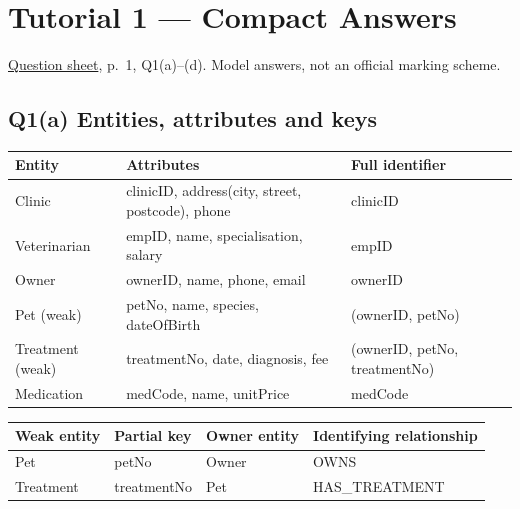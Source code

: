 \clearpage
\section{Tutorial 1 --- Compact Answers}\label{tutorial1_answers}

\href{../../../slides/Tutorial1.pdf}{Question sheet}, p.~1, Q1(a)--(d). Model answers, not an official marking scheme.

\subsection{Q1(a) Entities, attributes and keys}\label{tutorial1_answers-q1a-entities-attributes-and-keys}

\begin{longtable}[]{@{}
  >{\raggedright\arraybackslash}p{}
  >{\raggedright\arraybackslash}p{}
  >{\raggedright\arraybackslash}p{}@{}}
\toprule\noalign{}
\begin{minipage}[b]{\linewidth}\raggedright
Entity
\end{minipage} & \begin{minipage}[b]{\linewidth}\raggedright
Attributes
\end{minipage} & \begin{minipage}[b]{\linewidth}\raggedright
Full identifier
\end{minipage} \\
\midrule\noalign{}
\endhead
\bottomrule\noalign{}
\endlastfoot
Clinic & clinicID, address(city, street, postcode), phone & clinicID \\
Veterinarian & empID, name, specialisation, salary & empID \\
Owner & ownerID, name, phone, email & ownerID \\
Pet (weak) & petNo, name, species, dateOfBirth & (ownerID, petNo) \\
Treatment (weak) & treatmentNo, date, diagnosis, fee & (ownerID, petNo, treatmentNo) \\
Medication & medCode, name, unitPrice & medCode \\
\end{longtable}

\begin{longtable}[]{@{}llll@{}}
\toprule\noalign{}
Weak entity & Partial key & Owner entity & Identifying relationship \\
\midrule\noalign{}
\endhead
\bottomrule\noalign{}
\endlastfoot
Pet & petNo & Owner & OWNS \\
Treatment & treatmentNo & Pet & HAS\_TREATMENT \\
\end{longtable}

